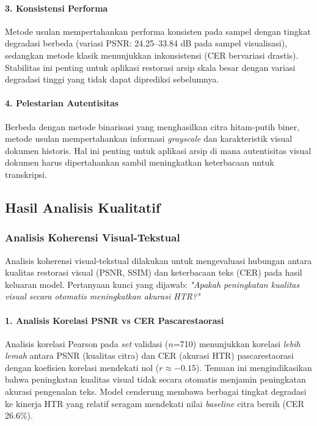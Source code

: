 \documentclass[12pt,a4paper]{article}
\begin{document}
\paragraph{3. Konsistensi Performa}
Metode usulan mempertahankan performa konsisten pada sampel dengan tingkat degradasi berbeda (variasi PSNR: 24.25--33.84 dB pada sampel visualisasi), sedangkan metode klasik menunjukkan inkonsistensi (CER bervariasi drastis). Stabilitas ini penting untuk aplikasi restorasi arsip skala besar dengan variasi degradasi tinggi yang tidak dapat diprediksi sebelumnya.

\paragraph{4. Pelestarian Autentisitas}
Berbeda dengan metode binarisasi yang menghasilkan citra hitam-putih biner, metode usulan mempertahankan informasi \textit{grayscale} dan karakteristik visual dokumen historis. Hal ini penting untuk aplikasi arsip di mana autentisitas visual dokumen harus dipertahankan sambil meningkatkan keterbacaan untuk transkripsi.

\vspace{0.8em}

\subsection{Hasil Analisis Kualitatif}
\label{subsec:hasil-kualitatif}
\vspace{0.8em}

\subsubsection{Analisis Koherensi Visual-Tekstual}
\label{subsubsec:koherensi-visual-tekstual}

Analisis koherensi visual-tekstual dilakukan untuk mengevaluasi hubungan antara kualitas restorasi visual (PSNR, SSIM) dan keterbacaan teks (CER) pada hasil keluaran model. Pertanyaan kunci yang dijawab: \textit{"Apakah peningkatan kualitas visual secara otomatis meningkatkan akurasi HTR?"}

\paragraph{1. Analisis Korelasi PSNR vs CER Pascarestaorasi}
Analisis korelasi Pearson pada \textit{set} validasi ($n$=710) menunjukkan korelasi \textit{lebih lemah} antara PSNR (kualitas citra) dan CER (akurasi HTR) pascarestaorasi dengan koefisien korelasi mendekati nol ($r \approx -0.15$). Temuan ini mengindikasikan bahwa peningkatan kualitas visual tidak secara otomatis menjamin peningkatan akurasi pengenalan teks. Model cenderung membawa berbagai tingkat degradasi ke kinerja HTR yang relatif seragam mendekati nilai \textit{baseline} citra bersih (CER 26.6\%).
\end{document}
